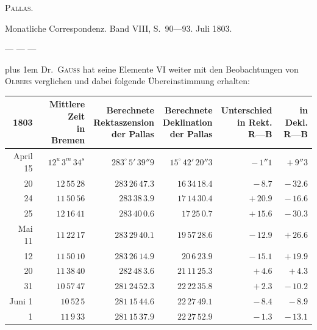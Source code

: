 %
\begin{center}\textsc{Pallas.}\end{center}

\medskip
Monatliche Correspondenz. Band VIII, S.\ 90—93. Juli 1803.

\medskip
— — —

\medskip
{\rightskip=0pt plus 1em
Dr.\ \textsc{Gauß} hat seine Elemente VI weiter mit den Beobachtungen von \textsc{Olbers} verglichen und dabei folgende Übereinstimmung erhalten:\par}


\begin{center}
\begingroup\fontsize{9}{11}\selectfont\setlength{\tabcolsep}{3pt}\renewcommand{\arraystretch}{1.12}
\begin{tabular}{r|r|r|r|r|r}
1803 & \shortstack{Mittlere Zeit\\in\\Bremen} & \shortstack{Berechnete\\Rektaszension\\der Pallas} & \shortstack{Berechnete\\Deklination\\der Pallas} & \shortstack{Unterschied\\in Rekt.\\R—B} & \shortstack{in Dekl.\\R—B} \\ \hline
April 15 & $12^u\,3^m\,34^s$ & $283^\circ\,5'\,39''9$ & $15^\circ\,42'\,20''3$ & $-\,1''1$ & $+\,9''3$ \\
20 & $12\,55\,28$ & $283\,26\,47.3$ & $16\,34\,18.4$ & $-\,8.7$ & $-\,32.6$ \\
24 & $11\,50\,56$ & $283\,38\,3.9$ & $17\,14\,30.4$ & $+\,20.9$ & $-\,16.6$ \\
25 & $12\,16\,41$ & $283\,40\,0.6$ & $17\,25\,0.7$ & $+\,15.6$ & $-\,30.3$ \\
Mai 11 & $11\,22\,17$ & $283\,29\,40.1$ & $19\,57\,28.6$ & $-\,12.9$ & $+\,26.6$ \\
12 & $11\,50\,10$ & $283\,26\,14.9$ & $20\,6\,23.9$ & $-\,15.1$ & $+\,19.9$ \\
20 & $11\,38\,40$ & $282\,48\,3.6$ & $21\,11\,25.3$ & $+\,4.6$ & $+\,4.3$ \\
31 & $10\,57\,47$ & $281\,24\,52.3$ & $22\,22\,35.8$ & $+\,2.3$ & $-\,10.2$ \\
Juni 1 & $10\,52\,5$ & $281\,15\,44.6$ & $22\,27\,49.1$ & $-\,8.4$ & $-\,8.9$ \\
1 & $11\,9\,33$ & $281\,15\,37.9$ & $22\,27\,52.9$ & $-\,1.3$ & $-\,13.1$ \\
\end{tabular}\endgroup
\end{center}

\begin{flushright}
\end{flushright}

\bigskip
